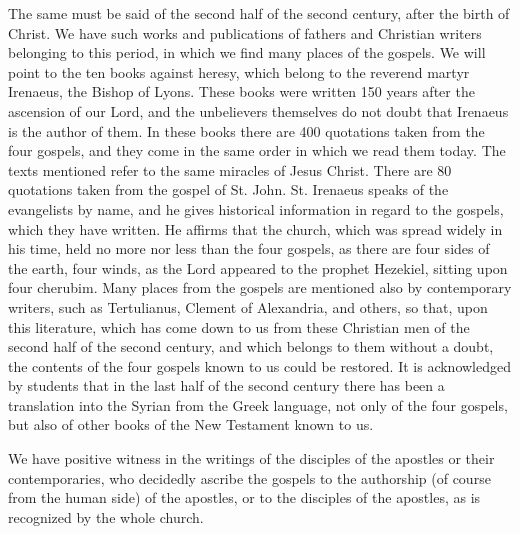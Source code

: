 The same must be said of the second half of the second century, after the birth of Christ. We have such works and publications of fathers and Christian writers belonging to this period, in which we find many places of the gospels. We will point to the ten books against heresy, which belong to the reverend martyr Irenaeus, the Bishop of Lyons. These books were written 150 years after the ascension of our Lord, and the unbelievers themselves do not doubt that Irenaeus is the author of them. In these books there are 400 quotations taken from the four gospels, and they come in the same order in which we read them today. The texts mentioned refer to the same miracles of Jesus Christ. There are 80 quotations taken from the gospel of St. John. St. Irenaeus speaks of the evangelists by name, and he gives historical information in regard to the gospels, which they have written. He affirms that the church, which was spread widely in his time, held no more nor less than the four gospels, as there are four sides of the earth, four winds, as the Lord appeared to the prophet Hezekiel, sitting upon four cherubim. Many places from the gospels are mentioned also by contemporary writers, such as Tertulianus, Clement of Alexandria, and others, so that, upon this literature, which has come down to us from these Christian men of the second half of the second century, and which belongs to them without a doubt, the contents of the four gospels known to us could be restored. It is acknowledged by students that in the last half of the second century there has been a translation into the Syrian from the Greek language, not only of the four gospels, but also of other books of the New Testament known to us.

We have positive witness in the writings of the disciples of the apostles or their contemporaries, who decidedly ascribe the gospels to the authorship (of course from the human side) of the apostles, or to the disciples of the apostles, as is recognized by the whole church.

